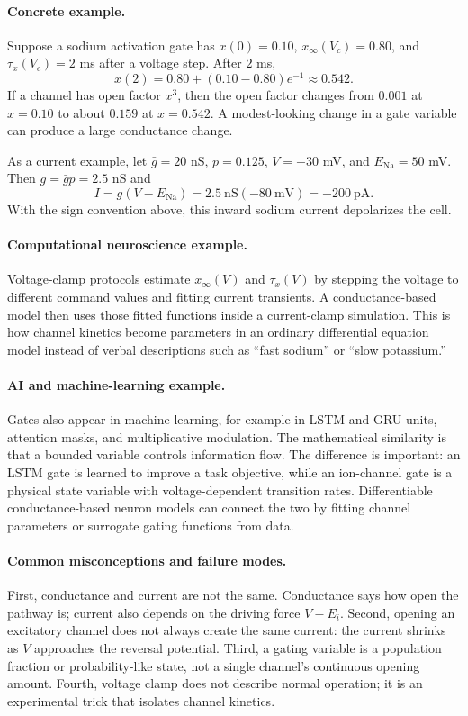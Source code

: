 \paragraph{Concrete example.}
Suppose a sodium activation gate has \(x(0)=0.10\), \(x_\infty(V_c)=0.80\), and \(\tau_x(V_c)=2\) ms after a voltage step. After \(2\) ms,
\[
x(2)=0.80+(0.10-0.80)e^{-1}\approx0.542.
\]
If a channel has open factor \(x^3\), then the open factor changes from \(0.001\) at \(x=0.10\) to about \(0.159\) at \(x=0.542\). A modest-looking change in a gate variable can produce a large conductance change.

As a current example, let \(\bar g=20\) nS, \(p=0.125\), \(V=-30\) mV, and \(E_{\mathrm{Na}}=50\) mV. Then \(g=\bar g p=2.5\) nS and
\[
I=g(V-E_{\mathrm{Na}})=2.5\ \mathrm{nS}(-80\ \mathrm{mV})=-200\ \mathrm{pA}.
\]
With the sign convention above, this inward sodium current depolarizes the cell.

\paragraph{Computational neuroscience example.}
Voltage-clamp protocols estimate \(x_\infty(V)\) and \(\tau_x(V)\) by stepping the voltage to different command values and fitting current transients. A conductance-based model then uses those fitted functions inside a current-clamp simulation. This is how channel kinetics become parameters in an ordinary differential equation model instead of verbal descriptions such as ``fast sodium'' or ``slow potassium.''

\paragraph{AI and machine-learning example.}
Gates also appear in machine learning, for example in LSTM and GRU units, attention masks, and multiplicative modulation. The mathematical similarity is that a bounded variable controls information flow. The difference is important: an LSTM gate is learned to improve a task objective, while an ion-channel gate is a physical state variable with voltage-dependent transition rates. Differentiable conductance-based neuron models can connect the two by fitting channel parameters or surrogate gating functions from data.

\paragraph{Common misconceptions and failure modes.}
First, conductance and current are not the same. Conductance says how open the pathway is; current also depends on the driving force \(V-E_i\). Second, opening an excitatory channel does not always create the same current: the current shrinks as \(V\) approaches the reversal potential. Third, a gating variable is a population fraction or probability-like state, not a single channel's continuous opening amount. Fourth, voltage clamp does not describe normal operation; it is an experimental trick that isolates channel kinetics.

